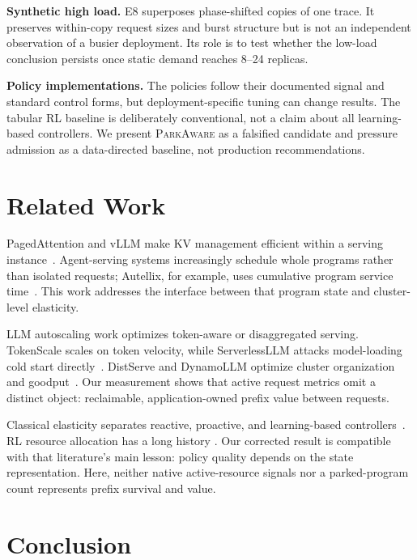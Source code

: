 \documentclass[sigconf,nonacm]{acmart}
\newcommand{\sys}{\textsc{ParkAware}\xspace}
\begin{document}
\textbf{Synthetic high load.} E8 superposes phase-shifted copies of one trace.
It preserves within-copy request sizes and burst structure but is not an
independent observation of a busier deployment. Its role is to test whether
the low-load conclusion persists once static demand reaches 8--24 replicas.

\textbf{Policy implementations.} The policies follow their documented signal
and standard control forms, but deployment-specific tuning can change results.
The tabular RL baseline is deliberately conventional, not a claim about all
learning-based controllers. We present \sys as a falsified candidate and
pressure admission as a data-directed baseline, not production recommendations.

\section{Related Work}

PagedAttention and vLLM make KV management efficient within a serving
instance~\cite{vllm}. Agent-serving systems increasingly schedule whole
programs rather than isolated requests; Autellix, for example, uses cumulative
program service time~\cite{autellix}. This work addresses the interface between
that program state and cluster-level elasticity.

LLM autoscaling work optimizes token-aware or disaggregated serving.
TokenScale scales on token velocity, while ServerlessLLM attacks model-loading
cold start directly~\cite{tokenscale,serverlessllm}. DistServe and DynamoLLM
optimize cluster organization and goodput~\cite{distserve,dynamollm}. Our
measurement shows that active request metrics omit a distinct object:
reclaimable, application-owned prefix value between requests.

Classical elasticity separates reactive, proactive, and learning-based
controllers~\cite{herbst,gari}. RL resource allocation has a long history
\cite{barrett}. Our corrected result is compatible with that literature's main
lesson: policy quality depends on the state representation. Here, neither
native active-resource signals nor a parked-program count represents prefix
survival and value.

\section{Conclusion}
\end{document}
